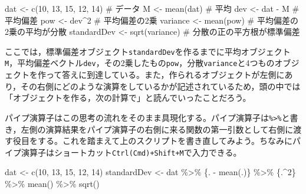 \documentclass[
  a4paper,
]{ltjsbook}
\newenvironment{Shaded}{\begin{snugshade}}{\end{snugshade}}
\newcommand{\CommentTok}[1]{\textcolor[rgb]{0.37,0.37,0.37}{#1}}
\newcommand{\DecValTok}[1]{\textcolor[rgb]{0.68,0.00,0.00}{#1}}
\newcommand{\FunctionTok}[1]{\textcolor[rgb]{0.28,0.35,0.67}{#1}}
\newcommand{\NormalTok}[1]{\textcolor[rgb]{0.00,0.23,0.31}{#1}}
\newcommand{\OtherTok}[1]{\textcolor[rgb]{0.00,0.23,0.31}{#1}}
\newcommand{\SpecialCharTok}[1]{\textcolor[rgb]{0.37,0.37,0.37}{#1}}
\begin{document}
\begin{Shaded}
\begin{Highlighting}[]
\NormalTok{dat }\OtherTok{\textless{}{-}} \FunctionTok{c}\NormalTok{(}\DecValTok{10}\NormalTok{, }\DecValTok{13}\NormalTok{, }\DecValTok{15}\NormalTok{, }\DecValTok{12}\NormalTok{, }\DecValTok{14}\NormalTok{) }\CommentTok{\# データ}
\NormalTok{M }\OtherTok{\textless{}{-}} \FunctionTok{mean}\NormalTok{(dat) }\CommentTok{\# 平均}
\NormalTok{dev }\OtherTok{\textless{}{-}}\NormalTok{ dat }\SpecialCharTok{{-}}\NormalTok{ M }\CommentTok{\# 平均偏差}
\NormalTok{pow }\OtherTok{\textless{}{-}}\NormalTok{ dev}\SpecialCharTok{\^{}}\DecValTok{2} \CommentTok{\# 平均偏差の2乗}
\NormalTok{variance }\OtherTok{\textless{}{-}} \FunctionTok{mean}\NormalTok{(pow) }\CommentTok{\# 平均偏差の2乗の平均が分散}
\NormalTok{standardDev }\OtherTok{\textless{}{-}} \FunctionTok{sqrt}\NormalTok{(variance) }\CommentTok{\# 分散の正の平方根が標準偏差}
\end{Highlighting}
\end{Shaded}

ここでは，標準偏差オブジェクト\texttt{standardDev}を作るまでに平均オブジェクト\texttt{M}，平均偏差ベクトル\texttt{dev}，その2乗したもの\texttt{pow}，分散\texttt{variance}と4つものオブジェクトを作って答えに到達している。また，作られるオブジェクトが左側にあり，その右側にどのような演算をしているかが記述されているため，頭の中では「オブジェクトを作る，次の計算で」と読んでいったことだろう。

パイプ演算子はこの思考の流れをそのまま具現化する。パイプ演算子は\texttt{\%\textgreater{}\%}と書き，左側の演算結果をパイプ演算子の右側に来る関数の第一引数として右側に渡す役目をする。これを踏まえて上のスクリプトを書き直してみよう。ちなみにパイプ演算子はショートカット\texttt{Ctrl(Cmd)+Shift+M}で入力できる。

\begin{Shaded}
\begin{Highlighting}[]
\NormalTok{dat }\OtherTok{\textless{}{-}} \FunctionTok{c}\NormalTok{(}\DecValTok{10}\NormalTok{, }\DecValTok{13}\NormalTok{, }\DecValTok{15}\NormalTok{, }\DecValTok{12}\NormalTok{, }\DecValTok{14}\NormalTok{)}
\NormalTok{standardDev }\OtherTok{\textless{}{-}}\NormalTok{ dat }\SpecialCharTok{\%\textgreater{}\%}
\NormalTok{  \{. }\SpecialCharTok{{-}} \FunctionTok{mean}\NormalTok{(.)\} }\SpecialCharTok{\%\textgreater{}\%}
\NormalTok{  \{.}\SpecialCharTok{\^{}}\DecValTok{2}\NormalTok{\} }\SpecialCharTok{\%\textgreater{}\%}
  \FunctionTok{mean}\NormalTok{() }\SpecialCharTok{\%\textgreater{}\%}
  \FunctionTok{sqrt}\NormalTok{()}
\end{Highlighting}
\end{Shaded}
\end{document}
